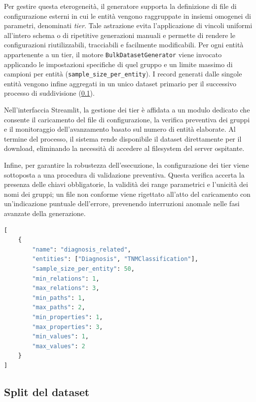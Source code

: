 \documentclass[12pt,a4paper,openright,twoside]{book}
\begin{document}
Per gestire questa eterogeneità, il generatore supporta la definizione di file
di configurazione esterni in cui le entità vengono raggruppate in insiemi
omogenei di parametri, denominati \emph{tier}. Tale astrazione evita
l'applicazione di vincoli uniformi all'intero schema o di ripetitive generazioni
manuali e permette di rendere le configurazioni riutilizzabili, tracciabili e
facilmente modificabili. Per ogni entità appartenente a un tier, il motore
\texttt{BulkDatasetGenerator} viene invocato applicando le impostazioni
specifiche di quel gruppo e un limite massimo di campioni per entità
(\texttt{sample\_size\_per\_entity}). I record generati dalle singole entità
vengono infine aggregati in un unico dataset primario per il successivo processo
di suddivisione (\cref{sec:impl-split}).

Nell'interfaccia Streamlit, la gestione dei tier è affidata a un modulo dedicato
che consente il caricamento del file di configurazione, la verifica preventiva
dei gruppi e il monitoraggio dell'avanzamento basato sul numero di entità
elaborate. Al termine del processo, il sistema rende disponibile il dataset
direttamente per il download, eliminando la necessità di accedere al filesystem
del server ospitante.

Infine, per garantire la robustezza dell'esecuzione, la configurazione dei tier
viene sottoposta a una procedura di validazione preventiva. Questa verifica
accerta la presenza delle chiavi obbligatorie, la validità dei range parametrici
e l'unicità dei nomi dei gruppi; un file non conforme viene rigettato all'atto
del caricamento con un'indicazione puntuale dell'errore, prevenendo interruzioni
anomale nelle fasi avanzate della generazione.

\begin{lstlisting}[language=Python, caption={Esempio minimo di configurazione di un tier da file JSON esterno.}, label={lst:tier-example}]
[
    {
        "name": "diagnosis_related",
        "entities": ["Diagnosis", "TNMClassification"],
        "sample_size_per_entity": 50,
        "min_relations": 1,
        "max_relations": 3,
        "min_paths": 1,
        "max_paths": 2,
        "min_properties": 1,
        "max_properties": 3,
        "min_values": 1,
        "max_values": 2
    }
]
\end{lstlisting}

\subsection{Split del dataset}
\label{sec:impl-split}
\end{document}
